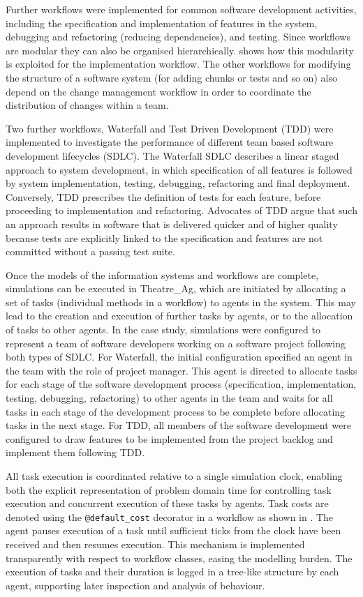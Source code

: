 \documentclass{llncs}
\begin{document}
Further workflows were implemented for common software development activities, including the specification and
implementation of features in the system, debugging and refactoring (reducing dependencies), and testing.  Since
workflows are modular they can also be organised hierarchically.   shows how this modularity is
exploited for the implementation workflow. The other workflows for modifying the structure of a software system (for
adding chunks or tests and so on) also depend on the change management workflow in order to coordinate the distribution
of changes within a team.

Two further workflows, Waterfall and Test Driven Development (TDD) were implemented to investigate the performance of
different team based software development lifecycles (SDLC).  The Waterfall SDLC \citep{benington83production} describes
a linear staged approach to system development, in which specification of all features is followed by system
implementation, testing, debugging, refactoring and final deployment.  Conversely, TDD \citep{beck02test} prescribes the
definition of tests for each feature, before proceeding to implementation and refactoring.  Advocates of TDD argue that
such an approach results in software that is delivered quicker and of higher quality because tests are explicitly linked
to the specification and features are not committed without a passing test suite.

Once the models of the information systems and workflows are complete, simulations can be executed in Theatre\_Ag, which
are initiated by allocating a set of tasks (individual methods in a workflow) to agents in the system. This may
lead to the creation and execution of further tasks by agents, or to the allocation of tasks to other agents.  In the
case study, simulations were configured to represent a team of software developers working on a software project
following both types of SDLC.  For Waterfall, the initial configuration specified an agent in the team with the role of
project manager.  This agent is directed to allocate tasks for each stage of the software development process
(specification, implementation, testing, debugging, refactoring) to other agents in the team and waits for all tasks in
each stage of the development process to be complete before allocating tasks in the next stage.  For TDD, all members of
the software development were configured to draw features to be implemented from the project backlog and implement them
following TDD.

All task execution is coordinated relative to a single simulation clock, enabling both the explicit representation of
problem domain time for controlling task execution and concurrent execution of these tasks by agents.  Task costs are
denoted using the \lstinline!@default_cost! decorator in a workflow as shown in .  The agent pauses
execution of a task until sufficient ticks from the clock have been received and then resumes execution.  This mechanism
is implemented transparently with respect to workflow classes, easing the modelling burden.  The execution of tasks and
their duration is logged in a tree-like structure by each agent, supporting later inspection and analysis of behaviour.
\end{document}
